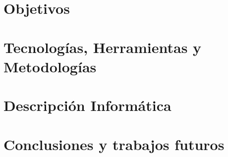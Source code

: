 \documentclass[12pt,twoside,titlepage]{report}
\newcommand\blankpage{%
    \newpage
    \null
    \thispagestyle{empty}%
    \newpage}
\begin{document}

\pagestyle{fancy}


\setlength{\parskip}{0.75em}
\renewcommand{\baselinestretch}{1.5}
\setcounter{page}{1}






\chapter{Objetivos}



\blankpage

\chapter{Tecnologías, Herramientas y Metodologías}


\blankpage

\chapter{Descripción Informática}
\label{chap:contenidos}



\blankpage


\chapter{Conclusiones y trabajos futuros}



\blankpage



{}

\footnotesize{
%


}
\end{document}
